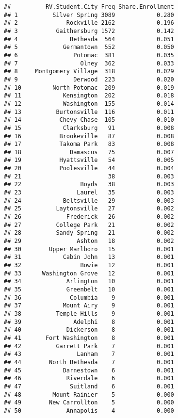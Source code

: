 \documentclass[]{article}
\begin{document}
\begin{verbatim}
##          RV.Student.City Freq Share.Enrollment
## 1          Silver Spring 3089            0.280
## 2              Rockville 2162            0.196
## 3           Gaithersburg 1572            0.142
## 4               Bethesda  564            0.051
## 5             Germantown  552            0.050
## 6                Potomac  381            0.035
## 7                  Olney  362            0.033
## 8     Montgomery Village  318            0.029
## 9                Derwood  223            0.020
## 10         North Potomac  209            0.019
## 11            Kensington  202            0.018
## 12            Washington  155            0.014
## 13          Burtonsville  116            0.011
## 14           Chevy Chase  105            0.010
## 15            Clarksburg   91            0.008
## 16           Brookeville   87            0.008
## 17           Takoma Park   83            0.008
## 18              Damascus   75            0.007
## 19           Hyattsville   54            0.005
## 20           Poolesville   44            0.004
## 21                         38            0.003
## 22                 Boyds   38            0.003
## 23                Laurel   35            0.003
## 24            Beltsville   29            0.003
## 25          Laytonsville   27            0.002
## 26             Frederick   26            0.002
## 27          College Park   21            0.002
## 28          Sandy Spring   21            0.002
## 29                Ashton   18            0.002
## 30        Upper Marlboro   15            0.001
## 31            Cabin John   13            0.001
## 32                 Bowie   12            0.001
## 33      Washington Grove   12            0.001
## 34             Arlington   10            0.001
## 35             Greenbelt   10            0.001
## 36              Columbia    9            0.001
## 37            Mount Airy    9            0.001
## 38          Temple Hills    9            0.001
## 39               Adelphi    8            0.001
## 40             Dickerson    8            0.001
## 41       Fort Washington    8            0.001
## 42          Garrett Park    7            0.001
## 43                Lanham    7            0.001
## 44        North Bethesda    7            0.001
## 45            Darnestown    6            0.001
## 46             Riverdale    6            0.001
## 47              Suitland    6            0.001
## 48         Mount Rainier    5            0.000
## 49        New Carrollton    5            0.000
## 50             Annapolis    4            0.000

\end{verbatim}
\end{document}

